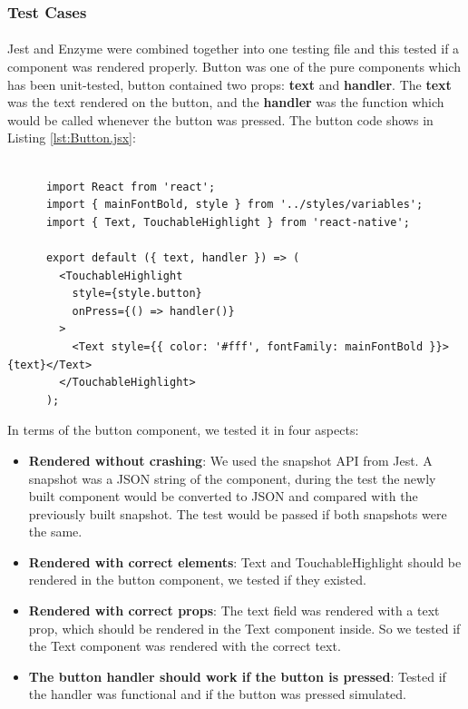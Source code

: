 \documentclass[12pt,a4paper]{article}
\begin{document}
        \subsubsection{Test Cases} %
          
          \paragraph{}Jest and Enzyme were combined together into one testing file and this tested if a component was rendered properly. Button was one of the pure components which has been unit-tested, button contained two props: {\bf text} and {\bf handler}. The {\bf text} was the text rendered on the button, and the {\bf handler} was the function which would be called whenever the button was pressed. The button code shows in Listing \ref{lst:Button.jsx}:
        
          \begin{lstlisting}[caption=Button.jsx, label={lst:Button.jsx}]

      import React from 'react';
      import { mainFontBold, style } from '../styles/variables';
      import { Text, TouchableHighlight } from 'react-native';

      export default ({ text, handler }) => (
        <TouchableHighlight
          style={style.button}
          onPress={() => handler()}
        >
          <Text style={{ color: '#fff', fontFamily: mainFontBold }}>{text}</Text>
        </TouchableHighlight>
      );

          \end{lstlisting}
        
          In terms of the button component, we tested it in four aspects: 
          \begin{itemize}
            \setlength\itemsep{0em}
            \item{\bf Rendered without crashing}: We used the snapshot API from Jest. A snapshot was a JSON string of the component, during the test the newly built component would be converted to JSON and compared with the previously built snapshot. The test would be passed if both snapshots were the same.  
            \item{\bf Rendered with correct elements}: Text and TouchableHighlight should be rendered in the button component, we tested if they existed.
            \item{\bf Rendered with correct props}: The text field was rendered with a text prop, which should be rendered in the Text component inside. So we tested if the Text component was rendered with the correct text.
            \item{\bf The button handler should work if the button is pressed}: Tested if the handler was functional and if the button was pressed simulated.
          \end{itemize} 
\end{document}
